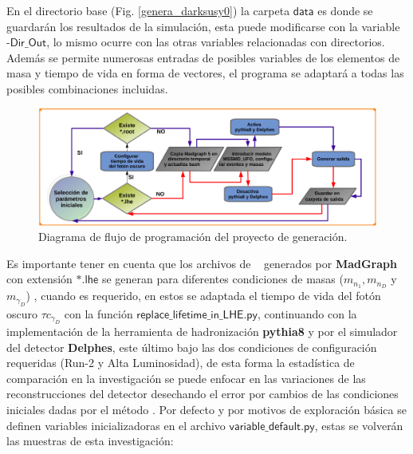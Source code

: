 En el directorio base (Fig. \ref{genera_darksusy0}) la carpeta $\textsf{data}$ es donde se guardarán los resultados de la simulación, esta puede modificarse con la variable $\textsf{-Dir\_Out}$, lo mismo ocurre con las otras variables relacionadas con directorios. Además se permite numerosas entradas de posibles variables de los elementos de masa y tiempo de vida en forma de vectores, el programa se adaptará a todas las posibles combinaciones incluidas. 

\begin{figure}[!h]
\centering
\includegraphics[width=1\textwidth]{Simulacion/imagenes/proyecto_darksusy2.png}
\caption{Diagrama de flujo de programación del proyecto de generación.}
\label{genera_darksusy2}
\end{figure}

Es importante tener en cuenta que los archivos de \MC ~ generados por \textbf{MadGraph} con extensión $\textsf{*.lhe}$ se generan para diferentes condiciones de masas ($m_{n_1}, m_{n_D}$ y  $m_{\gamma_D}$)%
, cuando  es requerido, en estos se adaptada el tiempo de vida del fotón oscuro $\tau c_{\gamma_D}$ %
con la función $\textsf{replace\_lifetime\_in\_LHE.py}$, continuando con la implementación de la herramienta de hadronización \textbf{pythia8} y por el simulador del detector \textbf{Delphes}, este último bajo las dos condiciones de configuración requeridas (Run-2 y Alta Luminosidad), de esta forma la estadística de comparación en la investigación se puede enfocar en las variaciones de las reconstrucciones del detector desechando el error por cambios de las condiciones iniciales dadas por el método \MC. 
Por defecto y por motivos de exploración básica se definen variables inicializadoras en el archivo $\textsf{variable\_default.py}$, estas se volverán las muestras de esta investigación:

